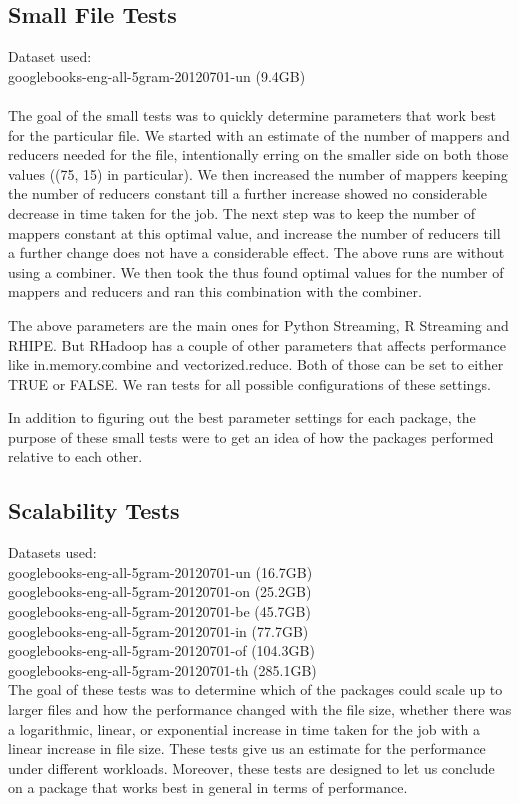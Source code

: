 \documentclass[
journal=jacsat, %
manuscript=article]{achemso}
\begin{document}
\subsection{Small File Tests}
Dataset used: \\
googlebooks-eng-all-5gram-20120701-un (9.4GB)\\ \\
The goal of the small tests was to quickly determine parameters that work best for the particular file. We started with an estimate of the number of mappers and reducers needed for the file, intentionally erring on the smaller side on both those values ((75, 15) in particular). We then increased the number of mappers keeping the number of reducers constant till a further increase showed no considerable decrease in time taken for the job. The next step was to keep the number of mappers constant at this optimal value, and increase the number of reducers till a further change does not have a considerable effect. The above runs are without using a combiner. We then took the thus found optimal values for the number of mappers and reducers and ran this combination with the combiner. 

The above parameters are the main ones for Python Streaming, R Streaming and RHIPE. But RHadoop has a couple of other parameters that affects performance like in.memory.combine and vectorized.reduce. Both of those can be set to either TRUE or FALSE. We ran tests for all possible configurations of these settings. 

In addition to figuring out the best parameter settings for each package, the purpose of these small tests were to get an idea of how the packages performed relative to each other. 

\subsection{Scalability Tests}
Datasets used: \\
    googlebooks-eng-all-5gram-20120701-un (16.7GB)\\
    googlebooks-eng-all-5gram-20120701-on (25.2GB)\\
    googlebooks-eng-all-5gram-20120701-be (45.7GB)\\
    googlebooks-eng-all-5gram-20120701-in (77.7GB)\\
    googlebooks-eng-all-5gram-20120701-of (104.3GB)\\
    googlebooks-eng-all-5gram-20120701-th (285.1GB)\\ \newline
The goal of these tests was to determine which of the packages could scale up to larger files and how the performance changed with the file size, whether there was a logarithmic, linear, or exponential increase in time taken for the job with a linear increase in file size. These tests give us an estimate for the performance under different workloads. Moreover, these tests are designed to let us conclude on a package that works best in general in terms of performance. 
\end{document}
